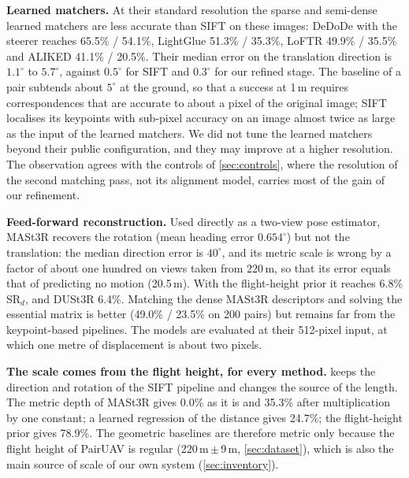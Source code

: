 \documentclass[10pt,twocolumn,letterpaper]{article}
\newcommand{\SRd}{SR$_{d}$}
\begin{document}
\noindent\textbf{Learned matchers.} At their standard resolution the sparse and semi-dense learned matchers are less accurate than SIFT on these images: DeDoDe with the steerer reaches 65.5\% / 54.1\%, LightGlue 51.3\% / 35.3\%, LoFTR 49.9\% / 35.5\% and ALIKED 41.1\% / 20.5\%. Their median error on the translation direction is $1.1^\circ$ to $5.7^\circ$, against $0.5^\circ$ for SIFT and $0.3^\circ$ for our refined stage. The baseline of a pair subtends about $5^\circ$ at the ground, so that a success at 1\,m requires correspondences that are accurate to about a pixel of the original image; SIFT localises its keypoints with sub-pixel accuracy on an image almost twice as large as the input of the learned matchers. We did not tune the learned matchers beyond their public configuration, and they may improve at a higher resolution. The observation agrees with the controls of \cref{sec:controls}, where the resolution of the second matching pass, not its alignment model, carries most of the gain of our refinement.

\noindent\textbf{Feed-forward reconstruction.} Used directly as a two-view pose estimator, MASt3R recovers the rotation (mean heading error $0.654^\circ$) but not the translation: the median direction error is $40^\circ$, and its metric scale is wrong by a factor of about one hundred on views taken from 220\,m, so that its error equals that of predicting no motion (20.5\,m). With the flight-height prior it reaches 6.8\% \SRd, and DUSt3R 6.4\%. Matching the dense MASt3R descriptors and solving the essential matrix is better (49.0\% / 23.5\% on 200 pairs) but remains far from the keypoint-based pipelines. The models are evaluated at their 512-pixel input, at which one metre of displacement is about two pixels.

\noindent\textbf{The scale comes from the flight height, for every method.}  keeps the direction and rotation of the SIFT pipeline and changes the source of the length. The metric depth of MASt3R gives 0.0\% as it is and 35.3\% after multiplication by one constant; a learned regression of the distance gives 24.7\%; the flight-height prior gives 78.9\%. The geometric baselines are therefore metric only because the flight height of PairUAV is regular (220\,m\,$\pm$\,9\,m, \cref{sec:dataset}), which is also the main source of scale of our own system (\cref{sec:inventory}).
\end{document}
